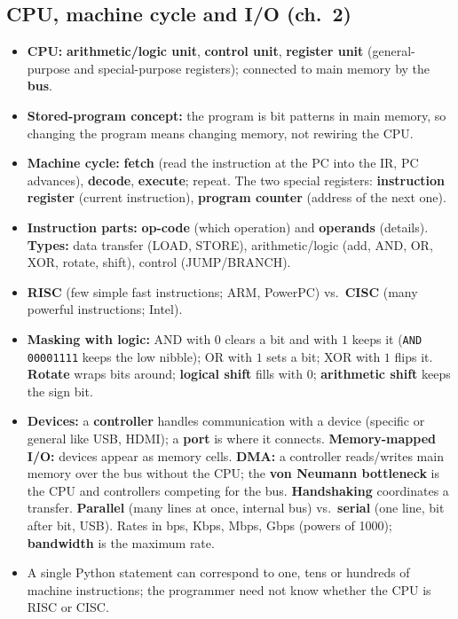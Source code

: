 \documentclass{fkt-notes}
\begin{document}
\subsection{CPU, machine cycle and I/O (ch.~2)}
\begin{itemize}[nosep]
  \item \textbf{CPU:} \textbf{arithmetic/logic unit}, \textbf{control unit}, \textbf{register unit} (general-purpose and special-purpose registers); connected to main memory by the \textbf{bus}.
  \item \textbf{Stored-program concept:} the program is bit patterns in main memory, so changing the program means changing memory, not rewiring the CPU.
  \item \textbf{Machine cycle:} \textbf{fetch} (read the instruction at the PC into the IR, PC advances), \textbf{decode}, \textbf{execute}; repeat. The two
        special registers: \textbf{instruction register} (current instruction), \textbf{program counter} (address of the next one).
  \item \textbf{Instruction parts:} \textbf{op-code} (which operation) and \textbf{operands} (details). \textbf{Types:} data transfer (LOAD, STORE), arithmetic/logic
        (add, AND, OR, XOR, rotate, shift), control (JUMP/BRANCH).
  \item \textbf{RISC} (few simple fast instructions; ARM, PowerPC) vs.\ \textbf{CISC} (many powerful instructions; Intel).
  \item \textbf{Masking with logic:} AND with $0$ clears a bit and with $1$ keeps it (\texttt{AND 00001111} keeps the low nibble); OR with $1$ sets a bit; XOR with $1$ flips it.
        \textbf{Rotate} wraps bits around; \textbf{logical shift} fills with 0; \textbf{arithmetic shift} keeps the sign bit.
  \item \textbf{Devices:} a \textbf{controller} handles communication with a device (specific or general like USB, HDMI); a \textbf{port} is where it connects.
        \textbf{Memory-mapped I/O:} devices appear as memory cells. \textbf{DMA:} a controller reads/writes main memory over the bus without the CPU;
        the \textbf{von Neumann bottleneck} is the CPU and controllers competing for the bus. \textbf{Handshaking} coordinates a transfer.
        \textbf{Parallel} (many lines at once, internal bus) vs.\ \textbf{serial} (one line, bit after bit, USB). Rates in bps, Kbps, Mbps, Gbps (powers of 1000);
        \textbf{bandwidth} is the maximum rate.
  \item A single Python statement can correspond to one, tens or hundreds of machine instructions; the programmer need not know whether the CPU is RISC or CISC.
\end{itemize}
\end{document}
